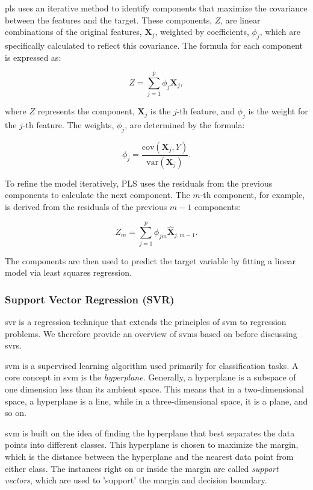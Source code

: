 \gls{pls} uses an iterative method to identify components that maximize the covariance between the features and the target.
These components, $Z$, are linear combinations of the original features, $\mathbf{X}_j$, weighted by coefficients, $\phi_j$, which are specifically calculated to reflect this covariance.
The formula for each component is expressed as:

$$
    Z = \sum_{j=1}^{p} \phi_j \mathbf{X}_j,
$$

where $Z$ represents the component, $\mathbf{X}_j$ is the $j$-th feature, and $\phi_j$ is the weight for the $j$-th feature.
The weights, $\phi_j$, are determined by the formula:

$$
    \phi_j = \frac{\text{cov}(\mathbf{X}_j, Y)}{\text{var}(\mathbf{X}_j)}.
$$

To refine the model iteratively, PLS uses the residuals from the previous components to calculate the next component.
The $m$-th component, for example, is derived from the residuals of the previous $m-1$ components:

$$
    Z_m = \sum_{j=1}^{p} \phi_{jm} \hat{\mathbf{X}}_{j, m-1}.
$$

The components are then used to predict the target variable by fitting a linear model via least squares regression.

\subsubsection{Support Vector Regression (SVR)}
\gls{svr} is a regression technique that extends the principles of \gls{svm} to regression problems.
We therefore provide an overview of \gls{svm}s based on \citet{James2023AnIS} before discussing \gls{svr}s.

\gls{svm} is a supervised learning algorithm used primarily for classification tasks.
A core concept in \gls{svm} is the \textit{hyperplane}.
Generally, a hyperplane is a subspace of one dimension less than its ambient space.
This means that in a two-dimensional space, a hyperplane is a line, while in a three-dimensional space, it is a plane, and so on.

\gls{svm} is built on the idea of finding the hyperplane that best separates the data points into different classes.
This hyperplane is chosen to maximize the margin, which is the distance between the hyperplane and the nearest data point from either class.
The instances right on or inside the margin are called \textit{support vectors}, which are used to 'support' the margin and decision boundary.

